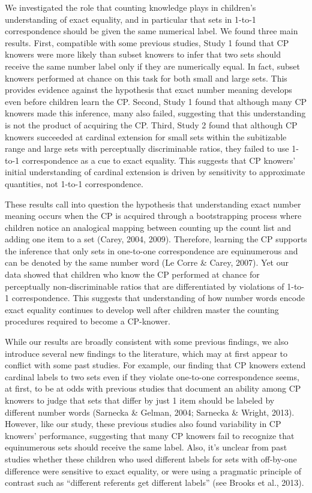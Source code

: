 \documentclass[10pt, letterpaper]{article}
\begin{document}
We investigated the role that counting knowledge plays in children's
understanding of exact equality, and in particular that sets in 1-to-1
correspondence should be given the same numerical label. We found three
main results. First, compatible with some previous studies, Study 1
found that CP knowers were more likely than subset knowers to infer that
two sets should receive the same number label only if they are
numerically equal. In fact, subset knowers performed at chance on this
task for both small and large sets. This provides evidence against the
hypothesis that exact number meaning develops even before children learn
the CP. Second, Study 1 found that although many CP knowers made this
inference, many also failed, suggesting that this understanding is not
the product of acquiring the CP. Third, Study 2 found that although CP
knowers succeeded at cardinal extension for small sets within the
subitizable range and large sets with perceptually discriminable ratios,
they failed to use 1-to-1 correspondence as a cue to exact equality.
This suggests that CP knowers' initial understanding of cardinal
extension is driven by sensitivity to approximate quantities, not 1-to-1
correspondence.

These results call into question the hypothesis that understanding exact
number meaning occurs when the CP is acquired through a bootstrapping
process where children notice an analogical mapping between counting up
the count list and adding one item to a set (Carey, 2004, 2009).
Therefore, learning the CP supports the inference that only sets in
one-to-one correspondence are equinumerous and can be denoted by the
same number word (Le Corre \& Carey, 2007). Yet our data showed that
children who know the CP performed at chance for perceptually
non-discriminable ratios that are differentiated by violations of 1-to-1
correspondence. This suggests that understanding of how number words
encode exact equality continues to develop well after children master
the counting procedures required to become a CP-knower.

While our results are broadly consistent with some previous findings, we
also introduce several new findings to the literature, which may at
first appear to conflict with some past studies. For example, our
finding that CP knowers extend cardinal labels to two sets even if they
violate one-to-one correspondence seems, at first, to be at odds with
previous studies that document an ability among CP knowers to judge that
sets that differ by just 1 item should be labeled by different number
words (Sarnecka \& Gelman, 2004; Sarnecka \& Wright, 2013). However,
like our study, these previous studies also found variability in CP
knowers' performance, suggesting that many CP knowers fail to recognize
that equinumerous sets should receive the same label. Also, it's unclear
from past studies whether these children who used different labels for
sets with off-by-one difference were sensitive to exact equality, or
were using a pragmatic principle of contrast such as ``different
referents get different labels'' (see Brooks et al., 2013).
\end{document}
